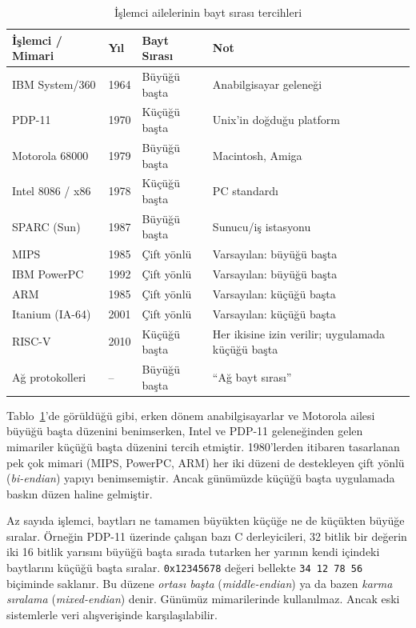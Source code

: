 \begin{table}[H]
\centering
\caption{İşlemci ailelerinin bayt sırası tercihleri}
\label{tab:endianness-tarihce}
\small
\begin{tabular}{llll}
\toprule
\textbf{İşlemci / Mimari} & \textbf{Yıl} & \textbf{Bayt Sırası} & \textbf{Not} \\
\midrule
IBM System/360       & 1964 & Büyüğü başta   & Anabilgisayar geleneği \\
PDP-11               & 1970 & Küçüğü başta   & Unix'in doğduğu platform \\
Motorola 68000       & 1979 & Büyüğü başta   & Macintosh, Amiga \\
Intel 8086 / x86     & 1978 & Küçüğü başta   & PC standardı \\
SPARC (Sun)          & 1987 & Büyüğü başta   & Sunucu/iş istasyonu \\
MIPS                 & 1985 & Çift yönlü     & Varsayılan: büyüğü başta \\
IBM PowerPC          & 1992 & Çift yönlü     & Varsayılan: büyüğü başta \\
ARM                  & 1985 & Çift yönlü     & Varsayılan: küçüğü başta \\
Itanium (IA-64)      & 2001 & Çift yönlü     & Varsayılan: küçüğü başta \\
RISC-V               & 2010 & Küçüğü başta   & Her ikisine izin verilir; uygulamada küçüğü başta \\
Ağ protokolleri      & --   & Büyüğü başta   & ``Ağ bayt sırası'' \\
\bottomrule
\end{tabular}
\end{table}

Tablo~\ref{tab:endianness-tarihce}'de görüldüğü gibi, erken dönem anabilgisayarlar ve Motorola ailesi büyüğü başta düzenini benimserken, Intel ve PDP-11 geleneğinden gelen mimariler küçüğü başta düzenini tercih etmiştir. 1980'lerden itibaren tasarlanan pek çok mimari (MIPS, PowerPC, ARM) her iki düzeni de destekleyen çift yönlü (\emph{bi-endian}) yapıyı benimsemiştir. Ancak günümüzde küçüğü başta uygulamada baskın düzen haline gelmiştir.

\begin{bilginot}
Az sayıda işlemci, baytları ne tamamen büyükten küçüğe ne de küçükten büyüğe sıralar. Örneğin PDP-11 üzerinde çalışan bazı C derleyicileri, 32 bitlik bir değerin iki 16 bitlik yarısını büyüğü başta sırada tutarken her yarının kendi içindeki baytlarını küçüğü başta sıralar. \texttt{0x12345678} değeri bellekte \texttt{34\,12\,78\,56} biçiminde saklanır. Bu düzene \emph{ortası başta} (\emph{middle-endian}) ya da bazen \emph{karma sıralama} (\emph{mixed-endian}) denir. Günümüz mimarilerinde kullanılmaz. Ancak eski sistemlerle veri alışverişinde karşılaşılabilir.
\end{bilginot}

